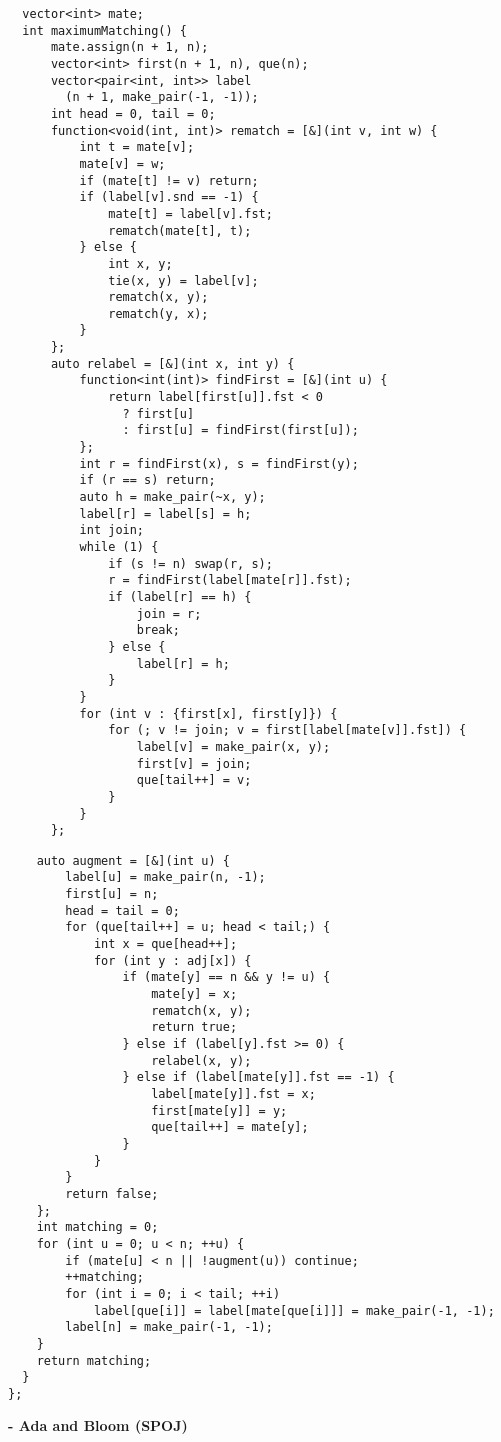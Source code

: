 \begin{center}
\begin{minipage}[t]{0.45\linewidth}
\begin{lstlisting}
  vector<int> mate;
  int maximumMatching() {
      mate.assign(n + 1, n);
      vector<int> first(n + 1, n), que(n);
      vector<pair<int, int>> label
        (n + 1, make_pair(-1, -1));
      int head = 0, tail = 0;
      function<void(int, int)> rematch = [&](int v, int w) {
          int t = mate[v];
          mate[v] = w;
          if (mate[t] != v) return;
          if (label[v].snd == -1) {
              mate[t] = label[v].fst;
              rematch(mate[t], t);
          } else {
              int x, y;
              tie(x, y) = label[v];
              rematch(x, y);
              rematch(y, x);
          }
      };
      auto relabel = [&](int x, int y) {
          function<int(int)> findFirst = [&](int u) {
              return label[first[u]].fst < 0
                ? first[u]
                : first[u] = findFirst(first[u]);
          };
          int r = findFirst(x), s = findFirst(y);
          if (r == s) return;
          auto h = make_pair(~x, y);
          label[r] = label[s] = h;
          int join;
          while (1) {
              if (s != n) swap(r, s);
              r = findFirst(label[mate[r]].fst);
              if (label[r] == h) {
                  join = r;
                  break;
              } else {
                  label[r] = h;
              }
          }
          for (int v : {first[x], first[y]}) {
              for (; v != join; v = first[label[mate[v]].fst]) {
                  label[v] = make_pair(x, y);
                  first[v] = join;
                  que[tail++] = v;
              }
          }
      };
\end{lstlisting}
\end{minipage}
\qquad
\begin{minipage}[t]{0.45\linewidth}
\begin{lstlisting}
    auto augment = [&](int u) {
        label[u] = make_pair(n, -1);
        first[u] = n;
        head = tail = 0;
        for (que[tail++] = u; head < tail;) {
            int x = que[head++];
            for (int y : adj[x]) {
                if (mate[y] == n && y != u) {
                    mate[y] = x;
                    rematch(x, y);
                    return true;
                } else if (label[y].fst >= 0) {
                    relabel(x, y);
                } else if (label[mate[y]].fst == -1) {
                    label[mate[y]].fst = x;
                    first[mate[y]] = y;
                    que[tail++] = mate[y];
                }
            }
        }
        return false;
    };
    int matching = 0;
    for (int u = 0; u < n; ++u) {
        if (mate[u] < n || !augment(u)) continue;
        ++matching;
        for (int i = 0; i < tail; ++i)
            label[que[i]] = label[mate[que[i]]] = make_pair(-1, -1);
        label[n] = make_pair(-1, -1);
    }
    return matching;
  }
};
\end{lstlisting}

\begin{problem}
  \textbf{- Ada and Bloom (SPOJ)} \cite{SPOJ_ADABLOOM}
\end{problem}
\end{minipage}
\end{center}


